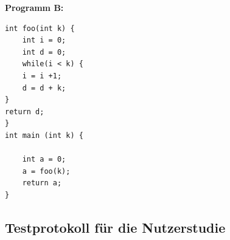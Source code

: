 \documentclass[parskip=full]{scrartcl}
\begin{document}
\textbf{Programm B:}
\begin{verbatim}
int foo(int k) {
	int i = 0;
	int d = 0;
	while(i < k) {
	i = i +1;
	d = d + k;
}
return d;
}
int main (int k) {

	int a = 0;
	a = foo(k);
	return a;
}
\end{verbatim}

\subsection{Testprotokoll für die Nutzerstudie}\label{usertest}


\end{document}
